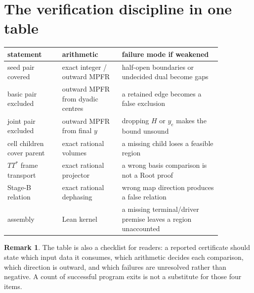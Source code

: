 \documentclass[10pt]{article}
\theoremstyle{definition}
\newtheorem{remark}[theorem]{Remark}
\begin{document}
\appendix
\section{The verification discipline in one table}

\begin{center}
\footnotesize
\begin{tabular}{p{0.22\linewidth}p{0.24\linewidth}p{0.40\linewidth}}
\toprule
statement & arithmetic & failure mode if weakened\\
\midrule
seed pair covered & exact integer / outward MPFR & half-open boundaries or undecided dual become gaps\\
basic pair excluded & outward MPFR from dyadic centres & a retained edge becomes a false exclusion\\
joint pair excluded & outward MPFR from final $y$ & dropping $H$ or $y_e$ makes the bound unsound\\
cell children cover parent & exact rational volumes & a missing child loses a feasible region\\
$TT^*$ frame transport & exact rational projector & a wrong basis comparison is not a Root proof\\
Stage-B relation & exact rational dephasing & wrong map direction produces a false relation\\
assembly & Lean kernel & a missing terminal/driver premise leaves a region unaccounted\\
\bottomrule
\end{tabular}
\end{center}

\begin{remark}
The table is also a checklist for readers: a reported certificate should state which input data it consumes, which arithmetic decides each comparison, which direction is outward, and which failures are unresolved rather than negative. A count of successful program exits is not a substitute for those four items.
\end{remark}
\end{document}

